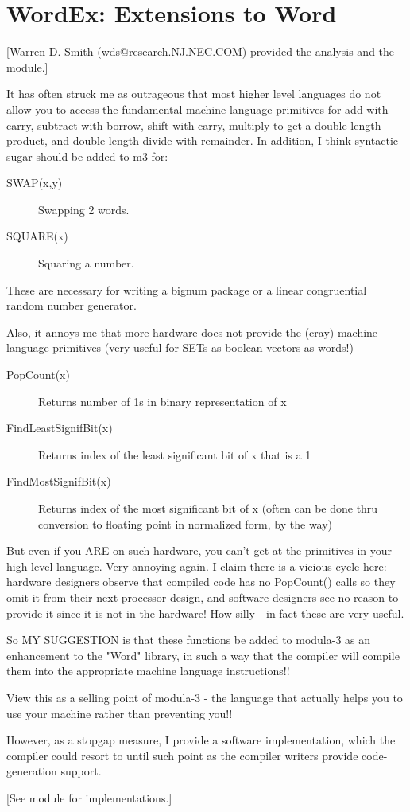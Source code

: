 \section{WordEx: Extensions to Word}
[Warren D. Smith (wds@research.NJ.NEC.COM) provided the
analysis and the module.]

It has often struck me as outrageous that most higher level
languages do not allow you to access the fundamental machine-language
primitives for add-with-carry, subtract-with-borrow, shift-with-carry,
multiply-to-get-a-double-length-product, and
double-length-divide-with-remainder. In addition, 
I think syntactic sugar should be added to m3 for:
\begin{description}
\item[SWAP(x,y)] Swapping 2 words.
\item[SQUARE(x)] Squaring a number.
\end{description}

These are necessary for writing a bignum package or a linear congruential
random number generator.

Also, it annoys me that more hardware does not provide the (cray)
machine language primitives (very useful for SETs as boolean vectors as words!)
\begin{description}
\item[PopCount(x)] Returns number of 1s in binary representation of x
\item[FindLeastSignifBit(x)]  Returns index of the least significant
bit of x that is a 1
\item[FindMostSignifBit(x)]  Returns index of the  most significant
bit of x (often can be done thru conversion to floating
point in normalized form, by the way)
\end{description}

But even if you ARE on such hardware, you can't get at the primitives
in your high-level language. Very annoying again. I claim there is a vicious
cycle here: hardware designers observe that compiled code has no PopCount()
calls so they omit it from their next processor design, and software
designers see no reason to provide it since it is not in the hardware!
How silly - in fact these are very useful.

So MY SUGGESTION is that these functions be added to modula-3 as an
enhancement to the "Word" library, in such a way that the compiler
will compile them into the appropriate machine language instructions!!

View this as a selling point of modula-3 - the language that actually
helps you to use your machine rather than preventing you!!

However, as a stopgap measure, I provide a software
implementation, which the compiler could resort to until such
point as the compiler writers provide code-generation support.

[See module for implementations.]
